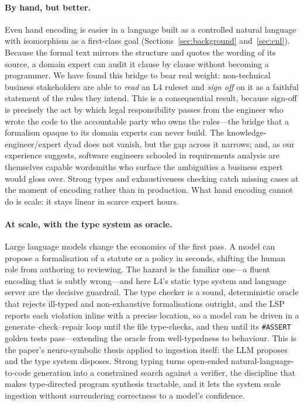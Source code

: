 \documentclass[sigconf,nonacm]{acmart}
\newcommand{\code}[1]{\texttt{\small #1}}
\begin{document}
\paragraph{By hand, but better.}
Even hand encoding is easier in a language built as a controlled natural
language with isomorphism as a first-class goal
(Sections~\ref{sec:background} and~\ref{sec:cnl}). Because the formal text
mirrors the structure and quotes the wording of its source, a domain expert
can audit it clause by clause without becoming a programmer. We have found
this bridge to bear real weight: non-technical business stakeholders are
able to \emph{read} an L4 ruleset and \emph{sign off} on it as a faithful
statement of the rules they intend. This is a consequential result, because
sign-off is precisely the act by which legal responsibility passes from the
engineer who wrote the code to the accountable party who owns the
rules---the bridge that a formalism opaque to its domain experts can never
build. The knowledge-engineer/expert dyad does not vanish, but the gap
across it narrows; and, as our experience suggests, software engineers
schooled in requirements analysis are themselves capable wordsmiths who
surface the ambiguities a business expert would gloss over. Strong types and
exhaustiveness checking catch missing cases at the moment of encoding rather
than in production. What hand encoding cannot do is scale: it stays linear
in scarce expert hours.

\paragraph{At scale, with the type system as oracle.}
Large language models change the economics of the first pass. A model can
propose a formalisation of a statute or a policy in seconds, shifting the
human role from authoring to reviewing. The hazard is the familiar one---a
fluent encoding that is subtly wrong---and here L4's static type system and
language server are the decisive guardrail. The type checker is a sound,
deterministic oracle that rejects ill-typed and non-exhaustive
formalisations outright, and the LSP reports each violation inline with a
precise location, so a model can be driven in a generate--check--repair loop
until the file type-checks, and then until its \code{\#ASSERT} golden tests
pass---extending the oracle from well-typedness to behaviour. This is the
paper's neuro-symbolic thesis applied to ingestion itself: the LLM proposes
and the type system disposes. Strong typing turns open-ended
natural-language-to-code generation into a constrained search against a
verifier, the discipline that makes type-directed program synthesis
tractable, and it lets the system scale ingestion without surrendering
correctness to a model's confidence.
\end{document}
